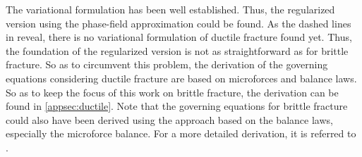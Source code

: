 \begin{table}[!ht]
\begin{center}
\begin{tabular}{|c||c|c|c|}
		\hline
	\end{tabular}
	\end{center}
 \label{fig:plastic}
\end{table}
The variational formulation has been well established. Thus, the regularized version using the phase-field approximation could be found. As the dashed lines in  reveal, there is no variational formulation of ductile fracture found yet. Thus, the foundation of the regularized version is not as straightforward as for brittle fracture. So as to circumvent this problem, the derivation of the governing equations considering ductile fracture are based on microforces and balance laws. So as to keep the focus of this work on brittle fracture, the derivation can be found in \ref{appsec:ductile}. Note that the governing equations for brittle fracture could also have been derived using the approach based on the balance laws, especially the microforce balance. For a more detailed derivation, it is referred to \citep{11_PF_DissBorden}. 